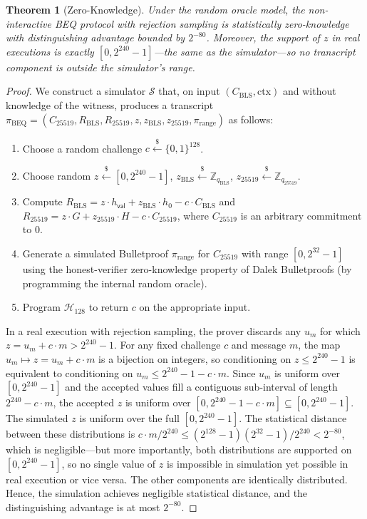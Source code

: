 \documentclass[11pt]{article}
\theoremstyle{definitionstyle}
\newtheorem{theorem}{Theorem}[section]
\theoremstyle{plain}
\begin{document}
\begin{theorem}[Zero-Knowledge]
Under the random oracle model, the non-interactive BEQ protocol with rejection sampling is statistically zero-knowledge with distinguishing advantage bounded by $2^{-80}$. Moreover, the support of $z$ in real executions is exactly $[0, 2^{240}-1]$---the same as the simulator---so no transcript component is outside the simulator's range.
\end{theorem}
\begin{proof}
We construct a simulator $\mathcal{S}$ that, on input $(C_{\text{BLS}}, \text{ctx})$ and without knowledge of the witness, produces a transcript $\pi_{\text{BEQ}} = (C_{25519}, R_{\text{BLS}}, R_{25519}, z, z_{\text{BLS}}, z_{25519}, \pi_{\text{range}})$ as follows:
\begin{enumerate}
\item Choose a random challenge $c \xleftarrow{\$} \{0,1\}^{128}$.
\item Choose random $z \xleftarrow{\$} [0, 2^{240}-1]$, $z_{\text{BLS}} \xleftarrow{\$} \mathbb{Z}_{q_{\text{BLS}}}$, $z_{25519} \xleftarrow{\$} \mathbb{Z}_{q_{25519}}$.
\item Compute $R_{\text{BLS}} = z \cdot h_{\mathsf{val}} + z_{\text{BLS}} \cdot h_0 - c \cdot C_{\text{BLS}}$ and $R_{25519} = z \cdot G + z_{25519} \cdot H - c \cdot C_{25519}$, where $C_{25519}$ is an arbitrary commitment to $0$.
\item Generate a simulated Bulletproof $\pi_{\text{range}}$ for $C_{25519}$ with range $[0,2^{32}-1]$ using the honest-verifier zero-knowledge property of Dalek Bulletproofs (by programming the internal random oracle).
\item Program $\mathcal{H}_{128}$ to return $c$ on the appropriate input.
\end{enumerate}
In a real execution with rejection sampling, the prover discards any $u_m$ for which $z = u_m + c \cdot m > 2^{240}-1$. For any fixed challenge $c$ and message $m$, the map $u_m \mapsto z = u_m + c \cdot m$ is a bijection on integers, so conditioning on $z \le 2^{240}-1$ is equivalent to conditioning on $u_m \le 2^{240}-1 - c \cdot m$. Since $u_m$ is uniform over $[0, 2^{240}-1]$ and the accepted values fill a contiguous sub-interval of length $2^{240} - c \cdot m$, the accepted $z$ is uniform over $[0, 2^{240}-1 - c \cdot m] \subseteq [0, 2^{240}-1]$. The simulated $z$ is uniform over the full $[0, 2^{240}-1]$. The statistical distance between these distributions is $c \cdot m / 2^{240} \le (2^{128}-1)(2^{32}-1)/2^{240} < 2^{-80}$, which is negligible---but more importantly, both distributions are supported on $[0, 2^{240}-1]$, so no single value of $z$ is impossible in simulation yet possible in real execution or vice versa. The other components are identically distributed. Hence, the simulation achieves negligible statistical distance, and the distinguishing advantage is at most $2^{-80}$.
\end{proof}
\end{document}
